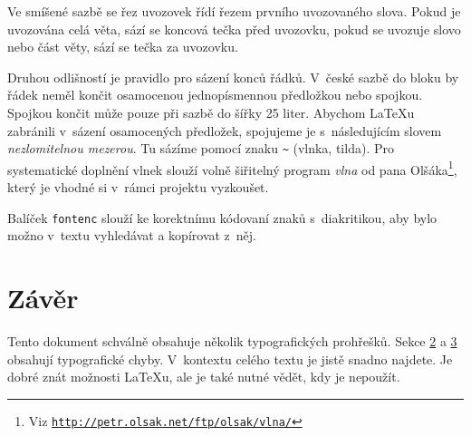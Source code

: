 \documentclass[a4paper, twocolumn, 10pt]{article}
\begin{document}
Ve smíšené sazbě se řez uvozovek řídí řezem prvního uvozovaného slova.
Pokud je uvozována celá věta, sází se koncová tečka před uvozovku, pokud se uvozuje slovo nebo část věty, sází se tečka za uvozovku.

Druhou odlišností je pravidlo pro sázení konců řádků.
V~české sazbě do bloku by řádek neměl končit osamocenou jednopísmennou předložkou nebo spojkou.
Spojkou  končit může pouze při sazbě do šířky 25 liter.
Abychom \LaTeX{}u zabránili v~sázení osamocených předložek, spojujeme je s~následujícím slovem \emph{nezlomitelnou mezerou}.
Tu sázíme pomocí znaku \verb|~| (vlnka, tilda).
Pro systematické doplnění vlnek slouží volně šiřitelný program \emph{vlna} od pana Olšáka\footnote{Viz \texttt{\url{http://petr.olsak.net/ftp/olsak/vlna/}}},
který je vhodné si v~rámci projektu vyzkoušet.

Balíček \texttt{fontenc} slouží ke korektnímu kódovaní znaků s~diakritikou, aby bylo možno v~textu vyhledávat a kopírovat z~něj.

\section{Závěr}

Tento dokument schválně obsahuje několik typografických prohřešků.
Sekce \hyperlink{section.2}{2} a \hyperlink{section.3}{3} obsahují typografické chyby.
V~kontextu celého textu je jistě snadno najdete.
Je dobré znát možnosti \LaTeX{}u, ale je také nutné vědět, kdy je nepoužít.
\end{document}

